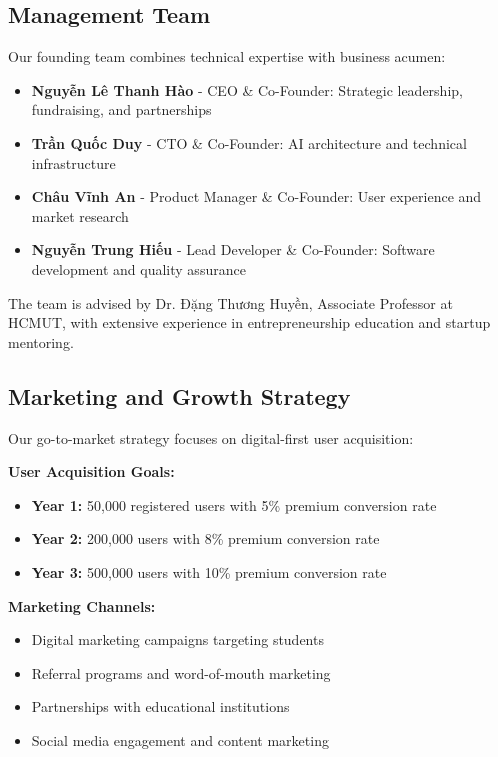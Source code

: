 \subsection{Management Team}
Our founding team combines technical expertise with business acumen:

\begin{itemize}
    \item \textbf{Nguyễn Lê Thanh Hào} - CEO \& Co-Founder: Strategic leadership, fundraising, and partnerships
    \item \textbf{Trần Quốc Duy} - CTO \& Co-Founder: AI architecture and technical infrastructure
    \item \textbf{Châu Vĩnh An} - Product Manager \& Co-Founder: User experience and market research
    \item \textbf{Nguyễn Trung Hiếu} - Lead Developer \& Co-Founder: Software development and quality assurance
\end{itemize}

The team is advised by Dr. Đặng Thương Huyền, Associate Professor at HCMUT, with extensive experience in entrepreneurship education and startup mentoring.

\subsection{Marketing and Growth Strategy}
Our go-to-market strategy focuses on digital-first user acquisition:

\textbf{User Acquisition Goals:}
\begin{itemize}
    \item \textbf{Year 1:} 50,000 registered users with 5\% premium conversion rate
    \item \textbf{Year 2:} 200,000 users with 8\% premium conversion rate
    \item \textbf{Year 3:} 500,000 users with 10\% premium conversion rate
\end{itemize}

\textbf{Marketing Channels:}
\begin{itemize}
    \item Digital marketing campaigns targeting students
    \item Referral programs and word-of-mouth marketing
    \item Partnerships with educational institutions
    \item Social media engagement and content marketing
\end{itemize}


